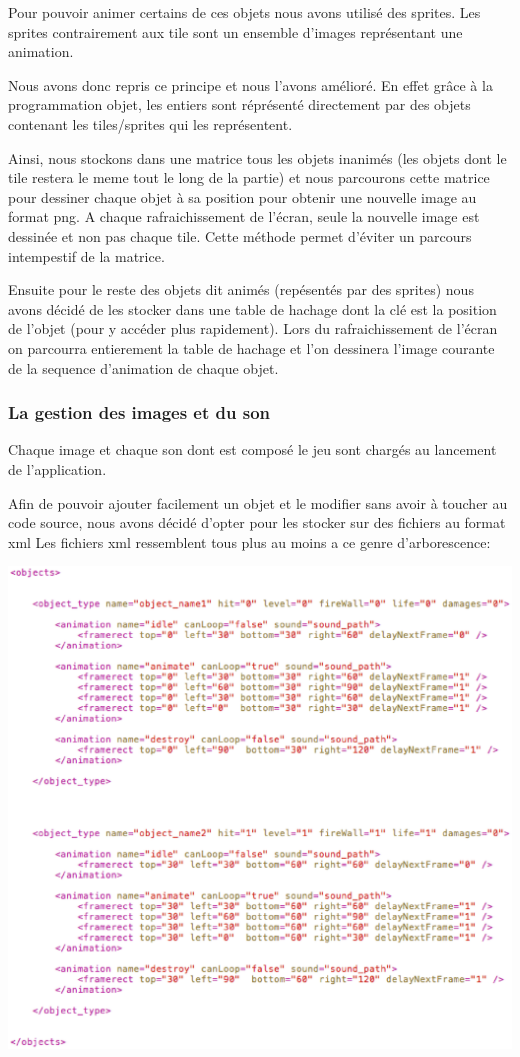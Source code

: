 			Pour pouvoir animer certains de ces objets nous avons utilisé des sprites.
			Les sprites contrairement aux tile sont un ensemble d'images représentant
			une animation.
		
			Nous avons donc repris ce principe et nous l'avons amélioré.
			En effet grâce à la programmation objet, les entiers sont réprésenté directement par des objets
			contenant les tiles/sprites qui les représentent.
			
			Ainsi, nous stockons dans une matrice tous les objets inanimés
			(les objets dont le tile restera le meme tout le long de la partie)
			et nous parcourons cette matrice pour dessiner chaque objet à sa 
			position pour obtenir une nouvelle image au format png.
			A chaque rafraichissement de l'écran, seule la nouvelle image est dessinée 
			et non pas chaque tile.
			Cette méthode permet d'éviter un parcours intempestif de la matrice.
			
			Ensuite pour le reste des objets dit animés (repésentés par des sprites)
			nous avons décidé de les stocker dans une table de hachage dont la 
			clé est la position de l'objet (pour y accéder plus rapidement).
			Lors du rafraichissement de l'écran on parcourra entierement la 
			table de hachage et l'on dessinera l'image courante de la sequence 
			d'animation de chaque objet.
		
		\subsubsection{La gestion des images et du son}
		
			Chaque image et chaque son dont est composé le jeu sont chargés au lancement de l'application.
 			
 			Afin de pouvoir ajouter facilement un objet et le modifier sans avoir à toucher au code
 			source, nous avons décidé d'opter pour les stocker sur des fichiers au format \gls{xml}
 			Les fichiers \gls{xml} ressemblent tous plus au moins a ce genre d'arborescence: 
		
		\includegraphics[width=15cm]{./Analyse/Img/exampleXmlBomberklob.eps}
		
